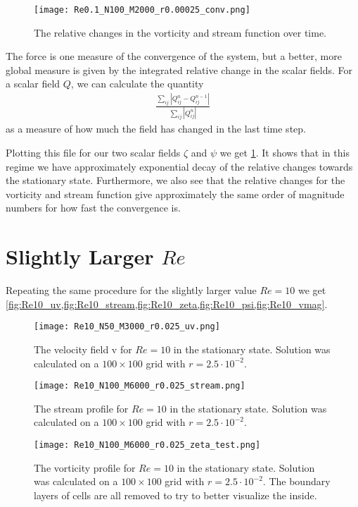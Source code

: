 \documentclass[10pt,a4paper,twocolumn]{article}
\renewcommand{\vec}[1]{\bm{\mathrm{#1}}}
\begin{document}
\begin{figure}[!h]
    \centering
    \texttt{[image: Re0.1\_N100\_M2000\_r0.00025\_conv.png]}
    \caption{The relative changes in the vorticity and stream function over time.}
    \label{fig:Re0.1_conv}
\end{figure}

The force is one measure of the convergence of the system, but a better, more global measure is given by the integrated relative change in the scalar fields. For a scalar field $Q$, we can calculate the quantity
%
\begin{align}
    \frac{\sum_{ij} |Q_{ij}^{n} - Q_{ij}^{n - 1}|}{\sum_{ij} |Q_{ij}^n|}
\end{align} 
%
as a measure of how much the field has changed in the last time step.

Plotting this file for our two scalar fields $\zeta$ and $\psi$ we get \cref{fig:Re0.1_conv}. It shows that in this regime we have approximately exponential decay of the relative changes towards the stationary state. Furthermore, we also see that the relative changes for the vorticity and stream function give approximately the same order of magnitude numbers for how fast the convergence is. 

\section{Slightly Larger \texorpdfstring{$Re$}{Re}}

Repeating the same procedure for the slightly larger value $Re=10$ we get \cref{fig:Re10_uv,fig:Re10_stream,fig:Re10_zeta,fig:Re10_psi,fig:Re10_vmag}.


\begin{figure}[!h]
    \centering
    \texttt{[image: Re10\_N50\_M3000\_r0.025\_uv.png]}
    \caption{The velocity field $\vec{v}$ for $Re=10$ in the stationary state. Solution was calculated on a $100 \times 100$ grid with $r=2.5 \cdot 10^{-2}$.}
    \label{fig:Re10_uv}
\end{figure}

\begin{figure}[!h]
    \centering
    \texttt{[image: Re10\_N100\_M6000\_r0.025\_stream.png]}
    \caption{The stream profile for $Re=10$ in the stationary state. Solution was calculated on a $100 \times 100$ grid with $r=2.5 \cdot 10^{-2}$.}
    \label{fig:Re10_stream}
\end{figure}

\begin{figure}[!h]
    \centering
    \texttt{[image: Re10\_N100\_M6000\_r0.025\_zeta\_test.png]}
    \caption{The vorticity profile for $Re=10$ in the stationary state. Solution was calculated on a $100 \times 100$ grid with $r=2.5 \cdot 10^{-2}$. The boundary layers of cells are all removed to try to better visualize the inside.}
    \label{fig:Re10_zeta}
\end{figure}
\end{document}
